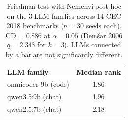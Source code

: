 \begin{table}[t]
\centering
\small
\caption{Friedman test with Nemenyi post-hoc on the 3 LLM families across 14 CEC 2018 benchmarks ($n=30$ seeds each). CD = 0.886 at $\alpha=0.05$ (Dem\v{s}ar 2006 $q=2.343$ for $k=3$). LLMs connected by a bar are not significantly different.}
\label{tab:friedman-crossllm}
\begin{tabular}{lc}
\toprule
\textbf{LLM family} & \textbf{Median rank} \\
\midrule
omnicoder-9b (code)          & 1.86 \\
qwen3.5:9b (chat)            & 1.96 \\
qwen2.5:7b (chat)            & 2.18 \\
\bottomrule
\end{tabular}
\end{table}
